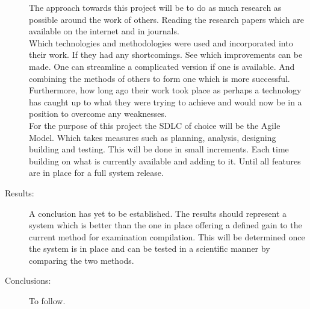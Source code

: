 \begin{description}
The approach towards this project will be to do as much research as possible around the work of others. Reading the research papers which are available on the internet and in journals. \\Which technologies and methodologies were used and incorporated into their work. If they had any shortcomings. See which improvements can be made. One can streamline a complicated version if one is available. And combining the methods of others to form one which is more successful. Furthermore, how long ago their work took place as perhaps a technology has caught up to what they were trying to achieve and would now be in a position to overcome any weaknesses. \\For the purpose of this project the SDLC of choice will be the Agile Model. Which takes measures such as planning, analysis, designing building and testing. This will be done in small increments. Each time building on what is currently available and adding to it. Until all features are in place for a full system release.

  \item[Results:]
  
  \begin{comment}
What's the answer? Specifically, most good computer architecture papers conclude that
something is so many percent faster, cheaper, smaller, or otherwise better than something else. Put
the result there, in numbers. Avoid vague, hand-waving results such as "very", "small", or
"significant." If you must be vague, you are only given license to do so when you can talk about
orders-of-magnitude improvement. There is a tension here in that you should not provide numbers
that can be easily misinterpreted, but on the other hand you don't have room for all the caveats.
\end{comment}

A conclusion has yet to be established. The results should represent a system which is better than the one in place offering a defined gain to the current method for examination compilation. This will be determined once the system is in place and can be tested in a scientific manner by comparing the two methods.

  \item[Conclusions:]
  
    \begin{comment}
What are the implications of your answer? Is it going to change the world (unlikely),
be a significant "win", be a nice hack, or simply serve as a road sign indicating that this path is
a waste of time (all of the previous results are useful). Are your results general, potentially
generalisable, or specific to a particular case?
\end{comment}

To follow.

\end{description}




\smallskip


